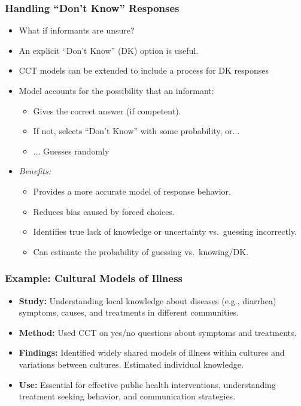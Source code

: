 \documentclass[aspectratio=169]{beamer}
\begin{document}
\begin{frame}
    \frametitle{Handling ``Don't Know'' Responses}
    \begin{itemize}
        \item What if informants are unsure? 
        \item An explicit ``Don't Know'' (DK) option is useful.
        \item CCT models can be extended to include a process for DK responses
        \item Model accounts for the possibility that an informant:
        \begin{itemize}
            \item Gives the correct answer (if competent).
            \item If not, selects ``Don't Know'' with some probability, or...
            \item ... Guesses randomly
        \end{itemize}
        \item \textit{Benefits:}
        \begin{itemize}
            \item Provides a more accurate model of response behavior.
            \item Reduces bias caused by forced choices.
            \item Identifies true lack of knowledge or uncertainty vs.\ guessing incorrectly.
        \item Can estimate the probability of guessing vs.\ knowing/DK.
        \end{itemize}
    \end{itemize}
\end{frame}


\begin{frame}
    \frametitle{Example: Cultural Models of Illness}
    \begin{itemize}
        \item \textbf{Study:} Understanding local knowledge about diseases (e.g., diarrhea) symptoms, causes, and treatments in different communities.
        \item \textbf{Method:} Used CCT on yes/no questions about symptoms and treatments.
        \item \textbf{Findings:} Identified widely shared models of illness within cultures and variations between cultures. Estimated individual knowledge.
        \item \textbf{Use:} Essential for effective public health interventions, understanding treatment seeking behavior, and communication strategies.
    \end{itemize}
\end{frame}
\end{document}
